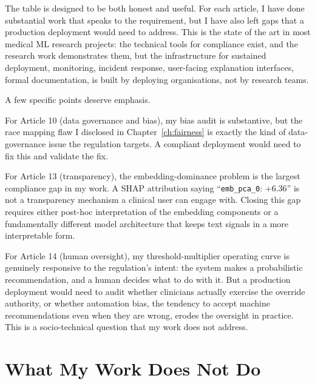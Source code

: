 The table is designed to be both honest and useful. For each article, I have done substantial work that speaks to the requirement, but I have also left gaps that a production deployment would need to address. This is the state of the art in most medical ML research projects: the technical tools for compliance exist, and the research work demonstrates them, but the infrastructure for sustained deployment, monitoring, incident response, user-facing explanation interfaces, formal documentation, is built by deploying organisations, not by research teams.

A few specific points deserve emphasis.

For Article 10 (data governance and bias), my bias audit is substantive, but the race mapping flaw I disclosed in Chapter~\ref{ch:fairness} is exactly the kind of data-governance issue the regulation targets. A compliant deployment would need to fix this and validate the fix.

For Article 13 (transparency), the embedding-dominance problem is the largest compliance gap in my work. A SHAP attribution saying ``\texttt{emb\_pca\_0}: $+6.36$'' is not a transparency mechanism a clinical user can engage with. Closing this gap requires either post-hoc interpretation of the embedding components or a fundamentally different model architecture that keeps text signals in a more interpretable form.

For Article 14 (human oversight), my threshold-multiplier operating curve is genuinely responsive to the regulation's intent: the system makes a probabilistic recommendation, and a human decides what to do with it. But a production deployment would need to audit whether clinicians actually exercise the override authority, or whether automation bias, the tendency to accept machine recommendations even when they are wrong, erodes the oversight in practice. This is a socio-technical question that my work does not address.

\section{What My Work Does Not Do}

